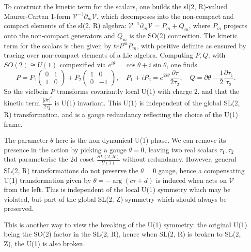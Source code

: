 To construct the kinetic term for the scalars, one builds the sl(2, R)-valued Maurer-Cartan 1-form $\mathcal{V}^{-1}\partial_m\mathcal{V}$, which decomposes into the non-compact and compact elements of the sl(2, R) algebra: $\mathcal{V}^{-1}\partial_m\mathcal{V} = P_m + Q_m$, where $P_m$ projects onto the non-compact generators and $Q_m$ is the SO(2) connection.
The kinetic term for the scalars is then given by $tr P^m P_m$, with positive definite as ensured by tracing over non-compact elements of a Lie algebra.
Computing $P, Q$, with $SO(2)\cong U(1)$ compexified via $e^{i\theta} = \cos\theta + i\sin\theta$, one finds
\begin{equation}
P = P_1\begin{pmatrix}
    0&1\\1&0
\end{pmatrix}+P_2\begin{pmatrix}
    1&0\\0&-1
\end{pmatrix},\quad
P_1 + iP_2 = e^{2i\theta}\frac{\partial \tau}{2 \tau_2},\quad
Q = \partial \theta - \frac{1}{2}\frac{\partial \tau_1}{\tau_2}.
\end{equation}
So the vielbein $P$ transforms covariantly local U(1) with charge 2, and that the kinetic term $\frac{|\partial \tau|^2}{2\tau_2^2}$ is U(1) invariant.
This U(1) is independent of the global SL(2, R) transformation, and is a gauge redundancy reflecting the choice of the U(1) frame.

The parameter $\theta$ here is the non-dynamical U(1) phase. 
We can remove its presence in the action by picking a gauge $\theta = 0$, leaving two real scalars $\tau_1, \tau_2$ that parameterise the 2d coset $\frac{SL(2, R)}{U(1)}$ without redundancy.
However, general SL(2, R) transformations do not preserve the $\theta = 0$ gauge, hence a compensating U(1) transformation given by $\theta = - \arg{(c\tau+d)}$ is induced when  acts on $\mathcal{V}$ from the left.
This is independent of the local U(1) symmetry which may be violated, but part of the global SL(2, Z) symmetry which should always be preserved.

This is another way to view the breaking of the U(1) symmetry: the original U(1) being the SO(2) factor in the SL(2, R), hence when SL(2, R) is broken to SL(2, Z), the U(1) is also broken.


